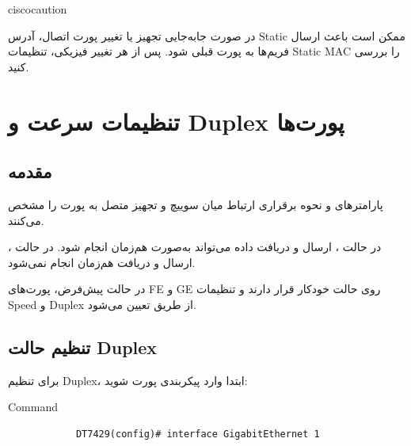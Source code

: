 \documentclass[11pt,letterpaper]{report}
\newenvironment{cautionbox}[1]{%
	\begin{noticebox}[title={\textbf{\faExclamationTriangle\ #1}}]{ciscocaution}
	}{%
	\end{noticebox}
}
\begin{document}
	\begin{cautionbox}{هشدار}
		در صورت جابه‌جایی تجهیز یا تغییر پورت اتصال، آدرس Static ممکن
		است باعث ارسال فریم‌ها به پورت قبلی شود. پس از هر تغییر فیزیکی،
		تنظیمات Static MAC را بررسی کنید.
	\end{cautionbox}



	\chapter{تنظیمات سرعت و Duplex پورت‌ها}

	\section{مقدمه}

	پارامترهای  و  نحوه برقراری ارتباط میان
	سوییچ و تجهیز متصل به پورت را مشخص می‌کنند.

	در حالت ، ارسال و دریافت داده می‌تواند به‌صورت
	هم‌زمان انجام شود. در حالت ، ارسال و دریافت
	هم‌زمان انجام نمی‌شود.

	در حالت پیش‌فرض، پورت‌های FE و GE روی حالت خودکار قرار دارند و
	تنظیمات Speed و Duplex از طریق  تعیین می‌شود.


	\section{تنظیم حالت Duplex}

	برای تنظیم Duplex، ابتدا وارد پیکربندی پورت شوید:

	\begin{latin}
		\begin{cliexample}{Command}
			\begin{verbatim}
			DT7429(config)# interface GigabitEthernet 1
			\end{verbatim}
		\end{cliexample}
	\end{latin}
\end{document}
